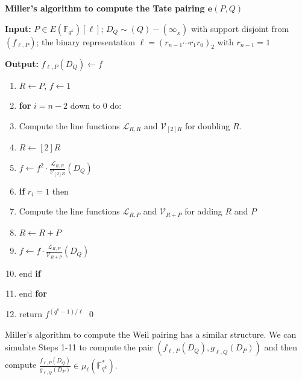 \documentclass[11pt, lettersize, notitlepage, leqno, footskip=0.6cm]{article}
\newcommand{\bFqk}{\mathbb{F}_{q^k}}
\newcommand{\mc}{\mathcal}
\newcommand{\e}{\mathbf{e}}
\newcommand{\vs}{\vspace{-2mm}}
\newcommand{\noin}{\noindent}
\newcommand{\mule}{\mu_{\ell}}
\numberwithin{equation}{section}
\begin{document}
\begin{mdframed} \textbf{Miller's algorithm to compute  the Tate pairing $\e(P,Q)$} \vspace{0.15cm}

\noin \textbf{Input:} $P\in E(\bFqk)[\ell]$; $D_Q\sim (Q)-(\infty_{_E})$ with support disjoint from $(f_{\ell,P})$; the binary representation $\ell = (r_{n-1}\cdots r_1 r_0)_2$ with $r_{n-1} = 1$ \vspace{0.15cm}

\noin \textbf{Output:} $f_{\ell,P}(D_Q)\gets f$ \vspace{0.15cm}

\begin{enumerate}[wide, labelwidth=!, labelindent=0pt]\vs \item $R\gets P$, $f\gets 1$

\item \textbf{for} $i = n-2$ down to $0$ do:

\item Compute the line functions $\mc{L}_{R,R}$ and $\mc{V}_{[2]R}$ for doubling $R$.

\item $R\gets [2]R$

\item $f\gets f^2\cdot \frac{\mc{L}_{R,R}}{\mc{V}_{[2]R}}(D_Q)$

\item \textbf{if} $r_i =1$ then 

\item Compute the line functions $\mc{L}_{R,P}$ and $\mc{V}_{R+P}$ for adding $R$ and $P$

\item $R\gets R+P$

\item $f\gets f\cdot \frac{\mc{L}_{R,P}}{\mc{V}_{R+P}}(D_Q)$

\item end \textbf{if}

\item end \textbf{for}

\item return $f^{(q^k-1)/{\ell}}$ \qed \end{enumerate} \end{mdframed}

\bigskip

Miller's algorithm to compute the Weil pairing has a similar structure. We can simulate Steps 1-11 to compute the pair $(f_{\ell,P}(D_Q), g_{\ell,Q}(D_P))$ and then compute $\frac{f_{\ell,P}(D_Q)}{g_{\ell,Q}(D_P)} \in \mule(\bFqk^*).$
\end{document}
